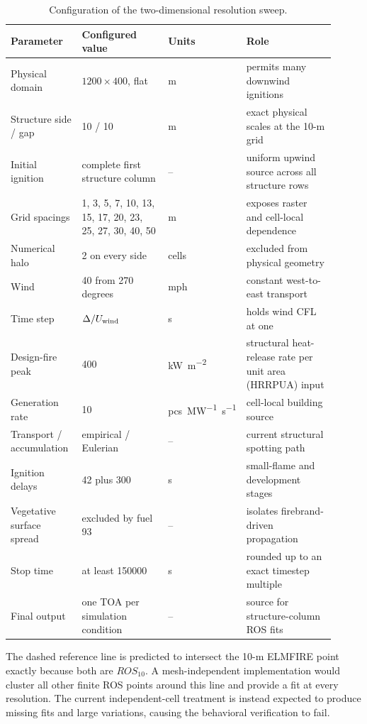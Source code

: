 \begin{table}[H]
\centering\footnotesize
\caption{Configuration of the two-dimensional resolution sweep.}
\begin{tabular}{@{}p{0.22\linewidth}p{0.27\linewidth}p{0.13\linewidth}p{0.29\linewidth}@{}}
\toprule
Parameter & Configured value & Units & Role\\
\midrule
Physical domain & \(1200\times400\), flat & m & permits many downwind ignitions\\
Structure side / gap & 10 / 10 & m & exact physical scales at the 10-m grid\\
Initial ignition & complete first structure column & -- & uniform upwind source across all structure rows\\
Grid spacings & 1, 3, 5, 7, 10, 13, 15, 17, 20, 23, 25, 27, 30, 40, 50 & m & exposes raster and cell-local dependence\\
Numerical halo & 2 on every side & cells & excluded from physical geometry\\
Wind & 40 from 270 degrees & mph & constant west-to-east transport\\
Time step & \(\Delta/U_{\rm wind}\) & s & holds wind CFL at one\\
Design-fire peak & 400 & \si{kW.m^{-2}} & structural heat-release rate per unit area (HRRPUA) input\\
Generation rate & 10 & \si{pcs.MW^{-1}.s^{-1}} & cell-local building source\\
Transport / accumulation & empirical / Eulerian & -- & current structural spotting path\\
Ignition delays & 42 plus 300 & s & small-flame and development stages\\
Vegetative surface spread & excluded by fuel 93 & -- & isolates firebrand-driven propagation\\
Stop time & at least 150000 & s & rounded up to an exact timestep multiple\\
Final output & one TOA per simulation condition & -- & source for structure-column ROS fits\\
\bottomrule
\end{tabular}
\end{table}

The dashed reference line is predicted to intersect the 10-m ELMFIRE point
exactly because both are \(ROS_{10}\). A mesh-independent implementation would
cluster all other finite ROS points around this line and provide a fit at every
resolution. The current independent-cell treatment is instead expected to
produce missing fits and large variations, causing the behavioral verification
to fail.

